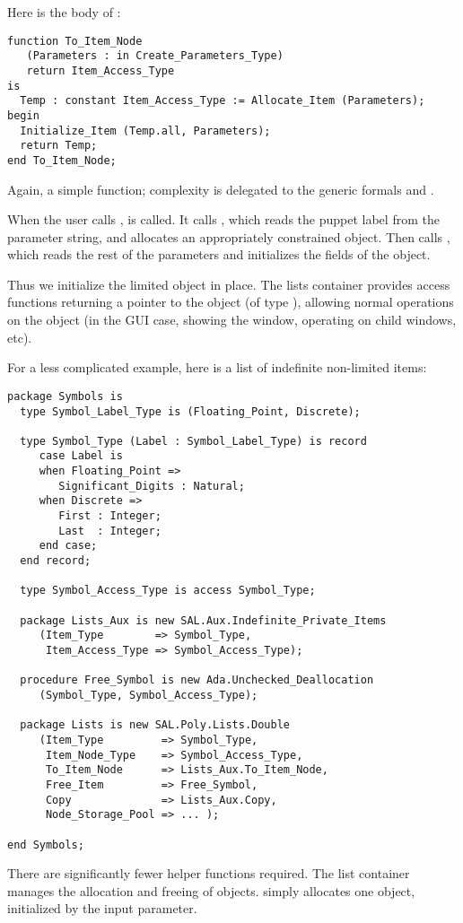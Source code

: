 \documentclass{article}
\begin{document}
Here is the body of :
\begin{verbatim}
function To_Item_Node
   (Parameters : in Create_Parameters_Type)
   return Item_Access_Type
is
  Temp : constant Item_Access_Type := Allocate_Item (Parameters);
begin
  Initialize_Item (Temp.all, Parameters);
  return Temp;
end To_Item_Node;
\end{verbatim}
Again, a simple function; complexity is delegated to the generic
formals  and .

When the user calls ,
 is called. It calls
, which reads the puppet label from the
parameter string, and allocates an appropriately constrained
 object. Then  calls
, which reads the rest of the parameters and
initializes the fields of the  object.

Thus we initialize the limited object in place. The lists container
provides access functions returning a pointer to the object (of type
), allowing normal operations on the object (in
the GUI case, showing the window, operating on child windows, etc).
 
For a less complicated example, here is a list of indefinite non-limited items:
\begin{verbatim}
package Symbols is
  type Symbol_Label_Type is (Floating_Point, Discrete);

  type Symbol_Type (Label : Symbol_Label_Type) is record
     case Label is
     when Floating_Point =>
        Significant_Digits : Natural;
     when Discrete =>
        First : Integer;
        Last  : Integer;
     end case;
  end record;

  type Symbol_Access_Type is access Symbol_Type;

  package Lists_Aux is new SAL.Aux.Indefinite_Private_Items
     (Item_Type        => Symbol_Type,
      Item_Access_Type => Symbol_Access_Type);

  procedure Free_Symbol is new Ada.Unchecked_Deallocation
     (Symbol_Type, Symbol_Access_Type);

  package Lists is new SAL.Poly.Lists.Double
     (Item_Type         => Symbol_Type,
      Item_Node_Type    => Symbol_Access_Type,
      To_Item_Node      => Lists_Aux.To_Item_Node,
      Free_Item         => Free_Symbol,
      Copy              => Lists_Aux.Copy,
      Node_Storage_Pool => ... );

end Symbols;
\end{verbatim}
There are significantly fewer helper functions required. The list
container manages the allocation and freeing of 
objects.  simply allocates one
 object, initialized by the input parameter.
\end{document}
